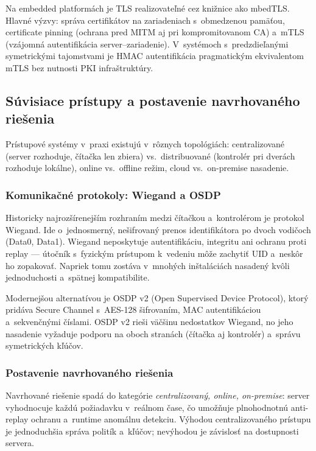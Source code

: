 Na embedded platformách je TLS realizovateľné cez knižnice ako mbedTLS\cite{RFC8446}. Hlavné výzvy: správa certifikátov na zariadeniach s~obmedzenou pamäťou, certificate pinning (ochrana pred MITM aj pri kompromitovanom CA) a~mTLS (vzájomná autentifikácia server--zariadenie)\cite{RFC9325}. V~systémoch s~predzdieľanými symetrickými tajomstvami je HMAC autentifikácia pragmatickým ekvivalentom mTLS bez nutnosti PKI infraštruktúry\cite{FIPS1981}.


\subsection{Súvisiace prístupy a postavenie navrhovaného riešenia}

Prístupové systémy v~praxi existujú v~rôznych topológiách: centralizované (server rozhoduje, čítačka len zbiera) vs.\ distribuované (kontrolér pri dverách rozhoduje lokálne), online vs.\ offline režim, cloud vs.\ on-premise nasadenie.

\subsubsection{Komunikačné protokoly: Wiegand a OSDP}

Historicky najrozšírenejším rozhraním medzi čítačkou a~kontrolérom je protokol Wiegand. Ide o~jednosmerný, nešifrovaný prenos identifikátora po dvoch vodičoch (Data0, Data1). Wiegand neposkytuje autentifikáciu, integritu ani ochranu proti replay --- útočník s~fyzickým prístupom k~vedeniu môže zachytiť UID a~neskôr ho zopakovať. Napriek tomu zostáva v~mnohých inštaláciách nasadený kvôli jednoduchosti a~spätnej kompatibilite.

Modernejšou alternatívou je OSDP v2 (Open Supervised Device Protocol)\cite{NIST80098}, ktorý pridáva Secure Channel s~AES-128 šifrovaním, MAC autentifikáciou a~sekvenčnými číslami. OSDP v2 rieši väčšinu nedostatkov Wiegand, no jeho nasadenie vyžaduje podporu na oboch stranách (čítačka aj kontrolér) a~správu symetrických kľúčov.

\subsubsection{Postavenie navrhovaného riešenia}

Navrhované riešenie spadá do kategórie \emph{centralizovaný, online, on-premise}\cite{NIST_PACS2018}: server vyhodnocuje každú požiadavku v~reálnom čase, čo umožňuje plnohodnotnú anti-replay ochranu a~runtime anomálnu detekciu. Výhodou centralizovaného prístupu je jednoduchšia správa politík a~kľúčov; nevýhodou je závislosť na dostupnosti servera.

